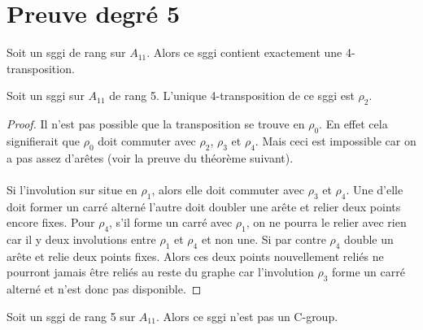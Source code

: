 \section{Preuve degré 5}

\begin{theorem}
  Soit un sggi de rang sur $A_{11}$. Alors ce sggi contient exactement une 4-transposition.
\end{theorem}

\begin{theorem}
  Soit un sggi sur $A_11$ de rang 5. L'unique 4-transposition de ce sggi est $\rho_2$.
\end{theorem}

\begin{proof}
  Il n'est pas possible que la transposition se trouve en $\rho_0$. En effet cela signifierait que $\rho_0$ doit commuter avec $\rho_2$, $\rho_3$ et $\rho_4$. Mais ceci est impossible car on a pas assez d'arêtes (voir la preuve du théorème suivant).

  \paragraph{}
  Si l'involution sur situe en $\rho_1$, alors elle doit commuter avec $\rho_3$ et $\rho_4$. Une d'elle doit former un carré alterné l'autre doit doubler une arête et relier deux points encore fixes. Pour $\rho_4$, s'il forme un carré avec $\rho_1$, on ne pourra le relier avec rien car il y deux involutions entre $\rho_1$ et $\rho_4$ et non une. Si par contre $\rho_4$ double un arête et relie deux points fixes. Alors ces deux points nouvellement reliés ne pourront jamais être reliés au reste du graphe car l'involution $\rho_3$ forme un carré alterné et n'est donc pas disponible.
\end{proof}

\begin{theorem}
  Soit un sggi de rang 5 sur $A_{11}$. Alors ce sggi n'est pas un C-group.
\end{theorem}

